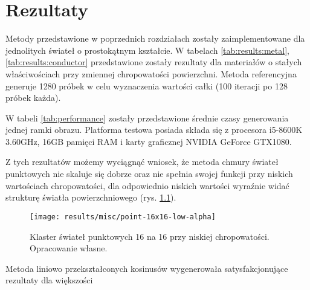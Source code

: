 \documentclass[../main.tex]{subfiles}
\begin{document}
\chapter{Rezultaty}

Metody przedstawione w poprzednich rozdziałach zostały zaimplementowane dla jednolitych świateł o prostokątnym kształcie. W tabelach \ref{tab:results:metal}, \ref{tab:results:conductor} przedstawione zostały rezultaty dla materiałów o stałych właściwościach przy zmiennej chropowatości powierzchni. Metoda referencyjna generuje 1280 próbek w celu wyznaczenia wartości całki (100 iteracji po 128 próbek każda).

W tabeli \ref{tab:performance} zostały przedstawione średnie czasy generowania jednej ramki obrazu. Platforma testowa posiada składa się z procesora i5-8600K 3.60GHz, 16GB pamięci RAM i karty graficznej NVIDIA GeForce GTX1080.

Z tych rezultatów możemy wyciągnąć wniosek, że metoda chmury świateł punktowych nie skaluje się dobrze oraz nie spełnia swojej funkcji przy niskich wartościach chropowatości, dla odpowiednio niskich wartości wyraźnie widać strukturę światła powierzchniowego (rys. \ref{fig:results:pointManyLowAlpha}).

\begin{figure}[h]
    \centering
    \texttt{[image: results/misc/point-16x16-low-alpha]}
    \caption{Klaster świateł punktowych 16 na 16 przy niskiej chropowatości. Opracowanie własne.}
    \label{fig:results:pointManyLowAlpha}
\end{figure}

Metoda liniowo przekształconych kosinusów wygenerowała satysfakcjonujące rezultaty dla większości 
\end{document}
